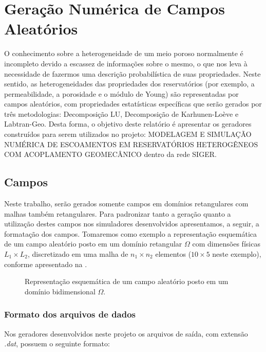 \documentclass[12pt,a4paper,portuges]{article}
\begin{document}
\section{Geração Numérica de Campos Aleatórios}
O conhecimento sobre a heterogeneidade de um meio poroso normalmente é incompleto devido a escassez
de informações sobre o mesmo, o que nos leva à necessidade de fazermos uma descrição probabilística
de suas propriedades. Neste sentido, as heterogeneidades das propriedades dos reservatórios (por
exemplo, a permeabilidade, a porosidade e o módulo de Young) são representadas por campos
aleatórios, com propriedades estatísticas específicas que serão gerados por três metodologias:
Decomposição LU, Decomposição de Karhunen-Loève e Labtran-Geo. Desta forma, o objetivo deste
relatório é apresentar os geradores construídos para serem utilizados no projeto:
\uppercase{Modelagem e Simulação Numérica de Escoamentos em Reservatórios Heterogêneos com
Acoplamento Geomecânico} dentro da rede SIGER.

\subsection{Campos}
Neste trabalho, serão gerados somente campos em domínios retangulares com malhas também
retangulares.
Para padronizar tanto a geração quanto a utilização destes campos nos simuladores desenvolvidos
apresentamos, a seguir, a formatação dos campos. Tomaremos como exemplo a representação esquemática
de um campo aleatório posto em um domínio retangular $\Omega$ com dimensões físicas $L_{1}\times
L_{2}$, discretizado em uma malha de $n_1\times n_2$ elementos ($10\times 5$ neste exemplo),
conforme apresentado na .
\begin{figure}[H]
\centering
  
  \caption{Representação esquemática de um campo aleatório posto em um domínio bidimensional
$\Omega$.}
\label{omega}
\end{figure}

\subsubsection{Formato dos arquivos de dados}

Nos geradores desenvolvidos neste projeto os arquivos de saída, com extensão {\em *.dat}, possuem o
seguinte formato:
\end{document}
